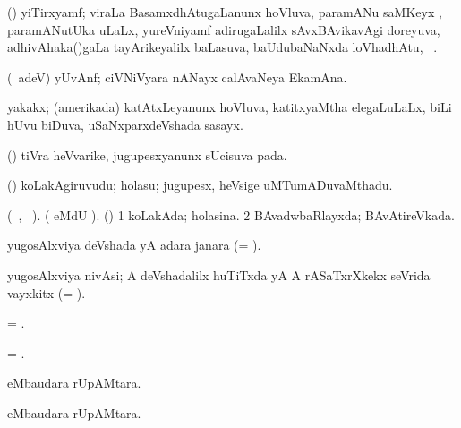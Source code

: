 \bentry
{} 
\gl{\nA} 
\bmng
(\ravi) yiTirxyamf; viraLa BasamxdhAtugaLanunx hoVluva, paramANu saMKeyx , paramANutUka  uLaLx,  yureVniyamf adirugaLalilx sAvxBAvikavAgi doreyuva, adhivAhaka()gaLa tayArikeyalilx baLasuva, baUdubaNaNxda loVhadhAtu, \saMkeV\ .
\emng
\eentry

\bentry
{} 
\gl{\nA} 
\bmng
(\bava\ adeV) yUvAnf; 
ciVNiVyara nANayx calAvaNeya EkamAna.
\emng
\eentry

\bentry
{} 
\gl{\nA} 
\bmng
yakakx; (amerikada) katAtxLeyanunx hoVluva, katitxyaMtha elegaLuLaLx, biLi hUvu biDuva, uSaNxparxdeVshada sasayx. \quad{}
\emng
\eentry

\bentry
{} 
\gl{\BAavayx}   
\bmng
(\ashi) tiVra heVvarike, jugupesxyanunx sUcisuva pada.
\emng
\eentry

\bentry
{} 
\gl{\nA}  
\bmng
(\ashi) koLakAgiruvudu; holasu; jugupesx, heVsige uMTumADuvaMthadu.
\emng
\eentry

\bentry
{} 
\gl{\gu} 
\bmng
(\tara\ , \tama\ ).
(  eMdU \parx).  (\ashi) 
\bnum
\num{1} koLakAda; holasina. 
\num{2} BAvadwbaRlayxda; BAvAtireVkada.
\enum
\emng
\eentry

\bentry
{} 
\gl{\gu} 
\bmng
yugosAlxviya deVshada yA adara janara (= ).
\emng
\eentry

\bentry
{} 
\gl{\nA} 
\bmng
yugosAlxviya nivAsi; A deVshadalilx huTiTxda yA A rASaTxrXkekx seVrida vayxkitx (= ).
\emng
\eentry

\bentry
{} 
\gl{\gu} 
\bmng
= .
\emng
\eentry

\bentry
{} 
\gl{\nA} 
\bmng
= .
\emng
\eentry

\bentry
{} 
\gl{\BAavayx} 
\bmng
{} eMbaudara rUpAMtara.
\emng 
\eentry

\bentry
{} 
\gl{\nA} 
\bmng
{} eMbaudara rUpAMtara.
\emng 
\eentry

